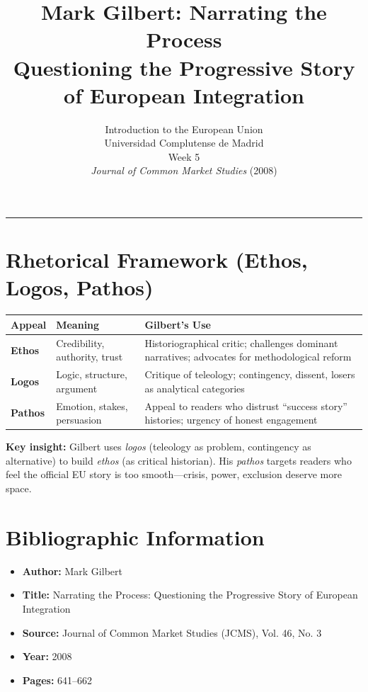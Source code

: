 \documentclass[11pt,a4paper]{article}
\begin{document}
\title{Mark Gilbert: Narrating the Process\\Questioning the Progressive Story of European Integration}
\author{Introduction to the European Union\\Universidad Complutense de Madrid\\Week 5\\\textit{Journal of Common Market Studies} (2008)}
\date{}
\maketitle
\vspace{-1em}
\hrule
\vspace{1em}

\section*{Rhetorical Framework (Ethos, Logos, Pathos)}

\begin{table}[h]
\centering
\begin{tabular}{@{}lll@{}}
\toprule
\textbf{Appeal} & \textbf{Meaning} & \textbf{Gilbert's Use} \\
\midrule
\textbf{Ethos} & Credibility, authority, trust & Historiographical critic; challenges dominant narratives; advocates for methodological reform \\
\textbf{Logos} & Logic, structure, argument & Critique of teleology; contingency, dissent, losers as analytical categories \\
\textbf{Pathos} & Emotion, stakes, persuasion & Appeal to readers who distrust ``success story'' histories; urgency of honest engagement \\
\bottomrule
\end{tabular}
\end{table}

\textbf{Key insight:} Gilbert uses \textit{logos} (teleology as problem, contingency as alternative) to build \textit{ethos} (as critical historian). His \textit{pathos} targets readers who feel the official EU story is too smooth---crisis, power, exclusion deserve more space.

\section*{Bibliographic Information}

\begin{itemize}
\item \textbf{Author:} Mark Gilbert
\item \textbf{Title:} Narrating the Process: Questioning the Progressive Story of European Integration
\item \textbf{Source:} Journal of Common Market Studies (JCMS), Vol. 46, No. 3
\item \textbf{Year:} 2008
\item \textbf{Pages:} 641--662
\end{itemize}
\end{document}
